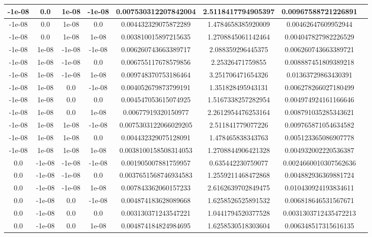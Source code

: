 \documentclass[a4paper]{article}
\begin{document}
\begin{center}
\begin{longtable}{@{}c|@{}c|@{}c|@{}c|@{}c|@{}c|@{}cX@{}}
		-1e-08 & 0.0 & 1e-08 & -1e-08 & 0.007530312207842004& 2.5118417794905397& 0.00967588721226891\\ \hline
		-1e-08 & 0.0 & 1e-08 & 0.0& 0.004432329075872289& 1.4784658385920009& 0.00462647609952944\\ \hline
		-1e-08 & 0.0 & 1e-08 & 1e-08 & 0.003810015897215635& 1.2708845061142464& 0.004047827982226529\\ \hline
		-1e-08 & 1e-08 & -1e-08 & -1e-08 & 0.006260743663389717& 2.088359296445375& 0.006260743663389721\\ \hline
		-1e-08 & 1e-08 & -1e-08 & 0.0& 0.006755117678579856& 2.25326471759855& 0.008887451809389218\\ \hline
		-1e-08 & 1e-08 & -1e-08 & 1e-08 & 0.009748370753186464& 3.251706471654326& 0.01363729863430391\\ \hline
		-1e-08 & 1e-08 & 0.0 & -1e-08 & 0.004052679873799191& 1.351828495943131& 0.006278266027180499\\ \hline
		-1e-08 & 1e-08 & 0.0 & 0.0& 0.004547053615074925& 1.5167338257282954& 0.004974924161166646\\ \hline
		-1e-08 & 1e-08 & 0.0 & 1e-08 & 0.00677919320150977& 2.2612954476253164& 0.008791035285343621\\ \hline
		-1e-08 & 1e-08 & 1e-08 & -1e-08 & 0.0075303122066029205& 2.511841779077226& 0.009765871054634582\\ \hline
		-1e-08 & 1e-08 & 1e-08 & 0.0& 0.004432329075128091& 1.478465838343763& 0.005123365086907778\\ \hline
		-1e-08 & 1e-08 & 1e-08 & 1e-08 & 0.0038100158508314053& 1.2708844906421328& 0.004932002220536387\\ \hline
		0.0 & -1e-08 & -1e-08 & -1e-08 & 0.001905007881759957& 0.635442230759077& 0.0024660010307562636\\ \hline
		0.0 & -1e-08 & -1e-08 & 0.0& 0.0037651568746934583& 1.2559211468472868& 0.004882936369881724\\ \hline
		0.0 & -1e-08 & -1e-08 & 1e-08 & 0.007843362060157233& 2.6162639702849475& 0.010430924193834611\\ \hline
		0.0 & -1e-08 & 0.0 & -1e-08 & 0.004874183628089668& 1.6258526525891532& 0.006818646531567671\\ \hline
		0.0 & -1e-08 & 0.0 & 0.0& 0.003130371243547221& 1.0441794520377528& 0.0031303712435472213\\ \hline
		0.0 & -1e-08 & 0.0 & 1e-08 & 0.004874184824984695& 1.6258530518303604& 0.006348517315616135\\ \hline

\end{longtable}
\end{center}
\end{document}
